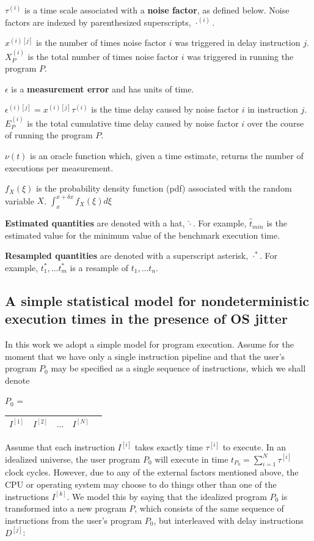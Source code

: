 \documentclass[conference]{IEEEtran}
\begin{document}
$\tau^{(i)}$ is a time scale associated with a \textbf{noise factor}, as defined below. Noise factors are indexed by parenthesized superscripts, $\cdot^{(i)}$.

$x^{(i)[j]}$ is the number of times noise factor $i$ was triggered in delay instruction $j$. $X_P^{(i)}$ is the total number of times noise factor $i$ was triggered in running the program $P$.

$\epsilon$ is a \textbf{measurement error} and has units of time.

$\epsilon^{(i)[j]} = x^{(i)[j]} \tau^{(i)}$ is the time delay caused by noise factor $i$ in instruction $j$. $E_P^{(i)}$ is the total cumulative time delay caused by noise factor $i$ over the course of running the program $P$.

$\nu(t)$ is an oracle function which, given a time estimate, returns the number of executions per measurement.

$f_X(\xi)$ is the probability density function (pdf) associated with the random variable $X$. $\int_{x}^{x+\delta x} f_X(\xi) d\xi$

\textbf{Estimated quantities} are denoted with a hat, $\hat\cdot$. For example, $\hat t_{min}$ is the estimated value for the minimum value of the benchmark execution time.

\textbf{Resampled quantities} are denoted with a superscript asterisk, $\cdot^*$. For example, $t^*_1, \dots t^*_m$ is a resample of $t_1, \dots t_n$.

\label{sec:statmodel}
\subsection{A simple statistical model for nondeterministic execution times in the presence of OS jitter}

In this work we adopt a simple model for program execution. Assume for the moment that we have only a single instruction pipeline and that the user's program $P_0$ may be specified as a single sequence of instructions, which we shall denote

$P_0$ = \begin{tabular}{|c|c|c|c|c|}
\hline
$I^{[1]}$ & $I^{[2]}$ & $\dots$ & $I^{[N]}$ \tabularnewline
\hline
\end{tabular}

Assume that each instruction $I^{[i]}$ takes exactly time $\tau^{[i]}$ to execute.
In an idealized universe, the user program $P_0$ will execute in time $t_{P_0} = \sum_{i=1}^N \tau^{[i]}$ clock cycles. However, due to any of the external factors mentioned above, the CPU or operating system may choose to do things other than one of the instructions $I^{[k]}$. We model this by saying that the idealized program $P_0$ is transformed into a new program $P$, which consists of the same sequence of instructions from the user's program $P_0$, but interleaved with delay instructions $D^{[j]}$:
\end{document}
